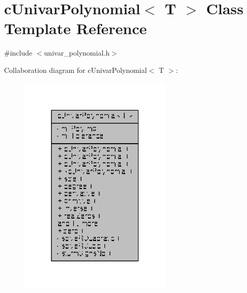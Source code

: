\hypertarget{classcUnivarPolynomial}{\section{c\-Univar\-Polynomial$<$ T $>$ Class Template Reference}
\label{classcUnivarPolynomial}
}


{\ttfamily \#include $<$univar\-\_\-polynomial.\-h$>$}



Collaboration diagram for c\-Univar\-Polynomial$<$ T $>$\-:
\nopagebreak
\begin{figure}[H]
\begin{center}
\leavevmode
\includegraphics[width=208pt]{classcUnivarPolynomial__coll__graph}
\end{center}
\end{figure}
